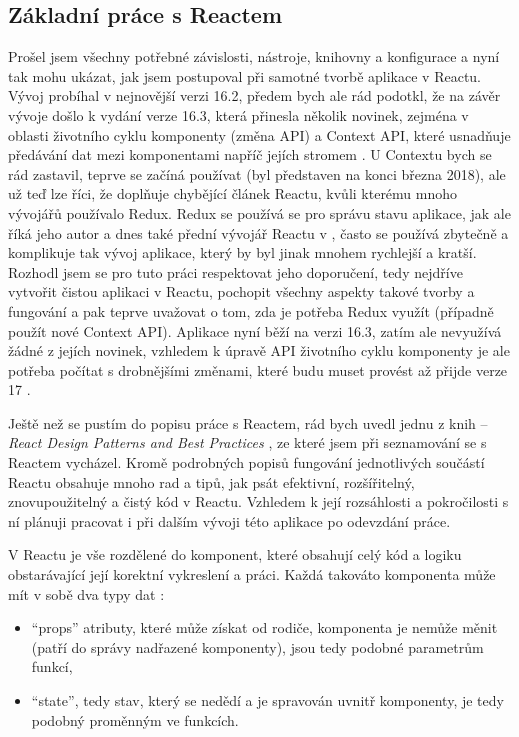     \subsection{Základní práce s Reactem}\label{sec:zakladniPraceSReactem}
    Prošel jsem všechny potřebné závislosti, nástroje, knihovny a konfigurace a nyní tak mohu ukázat, jak jsem postupoval při samotné tvorbě aplikace v Reactu. Vývoj probíhal v nejnovější verzi 16.2, předem bych ale rád podotkl, že na závěr vývoje došlo k vydání verze 16.3, která přinesla několik novinek, zejména v oblasti životního cyklu komponenty (změna API) a Context API, které usnadňuje předávání dat mezi komponentami napříč jejích stromem \cite{react-blog1}. U Contextu bych se rád zastavil, teprve se začíná používat (byl představen na konci března 2018), ale už teď lze říci, že doplňuje chybějící článek Reactu, kvůli kterému mnoho vývojářů používalo Redux. Redux se používá se pro správu stavu aplikace, jak ale říká jeho autor a dnes také přední vývojář Reactu v \cite{react-blog3}, často se používá zbytečně a komplikuje tak vývoj aplikace, který by byl jinak mnohem rychlejší a kratší. Rozhodl jsem se pro tuto práci respektovat jeho doporučení, tedy nejdříve vytvořit čistou aplikaci v Reactu, pochopit všechny aspekty takové tvorby a fungování a pak teprve uvažovat o tom, zda je potřeba Redux využít (případně použít nové Context API). Aplikace nyní běží na verzi 16.3, zatím ale nevyužívá žádné z jejích novinek, vzhledem k úpravě API životního cyklu komponenty je ale potřeba počítat s drobnějšími změnami, které budu muset provést až přijde verze 17 \cite{react-blog2}.
    
    Ještě než se pustím do popisu práce s Reactem, rád bych uvedl jednu z knih -- \textit{React Design Patterns and Best Practices} \cite{react-kniha}, ze které jsem při seznamování se s Reactem vycházel. Kromě podrobných popisů fungování jednotlivých součástí Reactu obsahuje mnoho rad a tipů, jak psát efektivní, rozšířitelný, znovupoužitelný a čistý kód v Reactu. Vzhledem k její rozsáhlosti a pokročilosti s ní plánuji pracovat i při dalším vývoji této aplikace po odevzdání práce.
    
    V Reactu je vše rozdělené do komponent, které obsahují celý kód a logiku obstarávající její korektní vykreslení a práci. Každá takováto komponenta může mít v sobě dva typy dat \cite{react-docs1}:
    \begin{itemize}
        \item \enquote{props} atributy, které může získat od rodiče, komponenta je nemůže měnit (patří do správy nadřazené komponenty), jsou tedy podobné parametrům funkcí,
        \item \enquote{state}, tedy stav, který se nedědí a je spravován uvnitř komponenty, je tedy podobný proměnným ve funkcích.
    \end{itemize}
    
